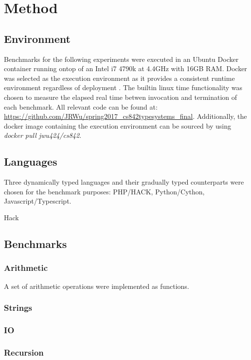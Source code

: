 \section{Method}
\subsection{Environment}
Benchmarks for the following experiments were executed in an Ubuntu Docker container running ontop of an Intel i7 4790k at 4.4GHz with 16GB RAM. Docker was selected as the execution environment as it provides a consistent runtime environment regardless of deployment \cite{Merkel:2014:DLL:2600239.2600241}. The builtin linux time functionality was chosen to measure the elapsed real time betwen invocation and termination of each benchmark. All relevant code can be found at: \url{https://github.com/JRWu/spring2017_cs842typesystems_final}. Additionally, the docker image containing the execution environment can be sourced by using \textit{docker pull jwu424/cs842}. 

\subsection{Languages}
Three dynamically typed languages and their gradually typed counterparts were chosen for the benchmark purposes: PHP/HACK, Python/Cython, Javascript/Typescript.

Hack \cite{Adams:2014:HVM:2660193.2660199}

\subsection{Benchmarks}
\subsubsection{Arithmetic}
A set of arithmetic operations were implemented as functions.  

\subsubsection{Strings}

\subsubsection{IO}

\subsubsection{Recursion}
